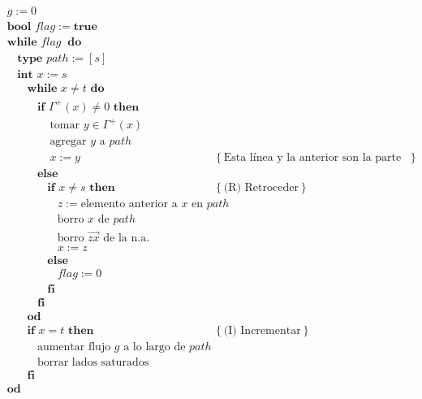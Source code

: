 \documentclass[a4paper, 12pt]{article}
\begin{document}
\begin{align*}
    &g := 0 \\ 
    &\textbf{bool } flag := \textbf{true} \\ 
    &\textbf{while } flag ~ \textbf{ do} \\ 
    & ~ ~ ~ ~ \textbf{type } path := [s] \\ 
    & ~ ~ ~ ~ \textbf{int } x := s \\ 
    & ~ ~ ~ ~ ~ ~ ~ ~ \textbf{while } x \neq t \textbf{ do } \\ 
    & ~ ~ ~ ~ ~ ~ ~ ~ ~ ~ ~ ~ \textbf{if } \Gamma^{+}(x) \neq 0 \textbf{ then } \\ 
    & ~ ~ ~ ~ ~ ~ ~ ~ ~ ~ ~ ~ ~ ~ ~ ~ ~ \text{tomar } y \in \Gamma^{+}(x) \\ 
    & ~ ~ ~ ~ ~ ~ ~ ~ ~ ~ ~ ~ ~ ~ ~ ~ ~ \text{agregar } y \text{ a } path \\ 
    & ~ ~ ~ ~ ~ ~ ~ ~ ~ ~ ~ ~ ~ ~ ~ ~ ~ x := y &\left\{ \text{Esta línea y la anterior son la parte (A) de avanzar} \right\}  \\ 
    & ~ ~ ~ ~ ~ ~ ~ ~ ~ ~ ~ ~ \textbf{else }  \\ 
    & ~ ~ ~ ~ ~ ~ ~ ~ ~ ~ ~ ~ ~ ~ ~ ~ \textbf{if } x \neq s \textbf{ then }  &\left\{ \text{(R) Retroceder} \right\} \\ 
    & ~ ~ ~ ~ ~ ~ ~ ~ ~ ~ ~ ~ ~ ~ ~ ~ ~ ~ ~ ~ z := \text{elemento anterior a $x$ en  } path  \\ 
    & ~ ~ ~ ~ ~ ~ ~ ~ ~ ~ ~ ~ ~ ~ ~ ~ ~ ~ ~ ~ \text{borro } x \text{ de } path\\ 
    & ~ ~ ~ ~ ~ ~ ~ ~ ~ ~ ~ ~ ~ ~ ~ ~ ~ ~ ~ ~ \text{borro } \overrightarrow{zx} \text{ de la n.a.}\\ 
    & ~ ~ ~ ~ ~ ~ ~ ~ ~ ~ ~ ~ ~ ~ ~ ~ ~ ~ ~ ~ x := z\\ 
    & ~ ~ ~ ~ ~ ~ ~ ~ ~ ~ ~ ~ ~ ~ ~ ~ \textbf{else }   \\ 
    & ~ ~ ~ ~ ~ ~ ~ ~ ~ ~ ~ ~ ~ ~ ~ ~ ~ ~ ~ ~ flag := 0   \\ 
    & ~ ~ ~ ~ ~ ~ ~ ~ ~ ~ ~ ~ ~ ~ ~ ~\textbf{fi} \\ 
    & ~ ~ ~ ~ ~ ~ ~ ~ ~ ~ ~ ~ \textbf{fi}\\
    & ~ ~ ~ ~ ~ ~ ~ ~ \textbf{od } \\
    & ~ ~ ~ ~ ~ ~ ~ ~ \textbf{if } x = t \textbf{ then } &\left\{ \text{(I) Incrementar} \right\}  \\ 
    & ~ ~ ~ ~ ~ ~ ~ ~ ~ ~ ~ ~ \text{aumentar flujo $g$ a lo largo de } path \\
    & ~ ~ ~ ~ ~ ~ ~ ~ ~ ~ ~ ~ \text{borrar lados saturados} \\ 
    & ~ ~ ~ ~ ~ ~ ~ ~ \textbf{fi}\\
    &\textbf{od}
\end{align*}
\end{document}
